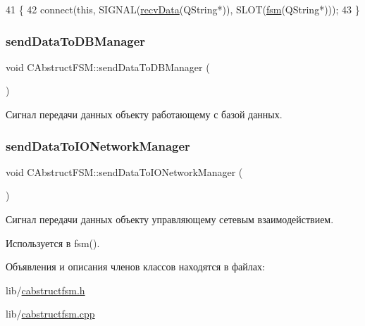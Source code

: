 \begin{DoxyCode}
41 \{
42     connect(\textcolor{keyword}{this}, SIGNAL(\hyperlink{class_c_abstruct_controller_item_a6898e48061cb0cac2065f8193bd386c1}{recvData}(QString*)), SLOT(\hyperlink{class_c_abstruct_f_s_m_ae06497e1f93385cd6c20eaa84fc253c1}{fsm}(QString*)));
43 \}
\end{DoxyCode}
\hypertarget{class_c_abstruct_f_s_m_a8b3e4a9134df07825f357d16e6d7c436}{}\label{class_c_abstruct_f_s_m_a8b3e4a9134df07825f357d16e6d7c436} 
\subsubsection{\texorpdfstring{send\+Data\+To\+D\+B\+Manager}{sendDataToDBManager}}
{\footnotesize\ttfamily void C\+Abstruct\+F\+S\+M\+::send\+Data\+To\+D\+B\+Manager (\begin{DoxyParamCaption}\item[{Q\+String $\ast$}]{ }\end{DoxyParamCaption})\hspace{0.3cm}{\ttfamily [signal]}}



Сигнал передачи данных объекту работающему с базой данных. 

\hypertarget{class_c_abstruct_f_s_m_a542570a7469e3923eeace7c3c308ff97}{}\label{class_c_abstruct_f_s_m_a542570a7469e3923eeace7c3c308ff97} 
\subsubsection{\texorpdfstring{send\+Data\+To\+I\+O\+Network\+Manager}{sendDataToIONetworkManager}}
{\footnotesize\ttfamily void C\+Abstruct\+F\+S\+M\+::send\+Data\+To\+I\+O\+Network\+Manager (\begin{DoxyParamCaption}\item[{Q\+String $\ast$}]{ }\end{DoxyParamCaption})\hspace{0.3cm}{\ttfamily [signal]}}



Сигнал передачи данных объекту управляющему сетевым взаимодействием. 



Используется в fsm().



Объявления и описания членов классов находятся в файлах\+:\begin{DoxyCompactItemize}
\item 
lib/\hyperlink{cabstructfsm_8h}{cabstructfsm.\+h}\item 
lib/\hyperlink{cabstructfsm_8cpp}{cabstructfsm.\+cpp}\end{DoxyCompactItemize}
